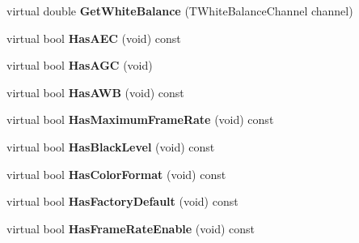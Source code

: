 \begin{DoxyCompactItemize}
\item 
\hypertarget{class_wizard_quick_setup_gen_i_cam_a1ba69f42b77b0fc9fdac86bab5ffecb3}{virtual double {\bfseries Get\+White\+Balance} (T\+White\+Balance\+Channel channel)}\label{class_wizard_quick_setup_gen_i_cam_a1ba69f42b77b0fc9fdac86bab5ffecb3}

\item 
\hypertarget{class_wizard_quick_setup_gen_i_cam_a48ae307058502acc5291e90a96c539a6}{virtual bool {\bfseries Has\+A\+E\+C} (void) const }\label{class_wizard_quick_setup_gen_i_cam_a48ae307058502acc5291e90a96c539a6}

\item 
\hypertarget{class_wizard_quick_setup_gen_i_cam_a0a7feb95b66fd0be8648f5d13f6484ca}{virtual bool {\bfseries Has\+A\+G\+C} (void)}\label{class_wizard_quick_setup_gen_i_cam_a0a7feb95b66fd0be8648f5d13f6484ca}

\item 
\hypertarget{class_wizard_quick_setup_gen_i_cam_a7b60437bb0f9627a1ac0da30030b995b}{virtual bool {\bfseries Has\+A\+W\+B} (void) const }\label{class_wizard_quick_setup_gen_i_cam_a7b60437bb0f9627a1ac0da30030b995b}

\item 
\hypertarget{class_wizard_quick_setup_gen_i_cam_ac0917ba53c8f37a70ed114ec06b98825}{virtual bool {\bfseries Has\+Maximum\+Frame\+Rate} (void) const }\label{class_wizard_quick_setup_gen_i_cam_ac0917ba53c8f37a70ed114ec06b98825}

\item 
\hypertarget{class_wizard_quick_setup_gen_i_cam_a9fd1bf8e2fef0db82f54bd0f51478845}{virtual bool {\bfseries Has\+Black\+Level} (void) const }\label{class_wizard_quick_setup_gen_i_cam_a9fd1bf8e2fef0db82f54bd0f51478845}

\item 
\hypertarget{class_wizard_quick_setup_gen_i_cam_a772df7b60b69fe9d5253f9688deba8cf}{virtual bool {\bfseries Has\+Color\+Format} (void) const }\label{class_wizard_quick_setup_gen_i_cam_a772df7b60b69fe9d5253f9688deba8cf}

\item 
\hypertarget{class_wizard_quick_setup_gen_i_cam_a9617b117f7f0fa00493754f33063b845}{virtual bool {\bfseries Has\+Factory\+Default} (void) const }\label{class_wizard_quick_setup_gen_i_cam_a9617b117f7f0fa00493754f33063b845}

\item 
\hypertarget{class_wizard_quick_setup_gen_i_cam_a40ee809f4f7759d4575ebe3075915bbb}{virtual bool {\bfseries Has\+Frame\+Rate\+Enable} (void) const }\label{class_wizard_quick_setup_gen_i_cam_a40ee809f4f7759d4575ebe3075915bbb}


\end{DoxyCompactItemize}
